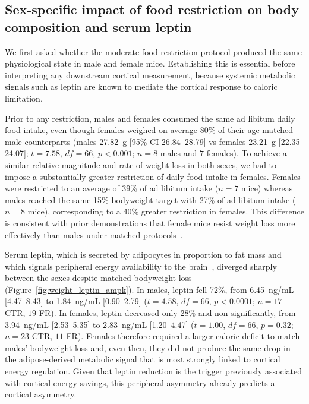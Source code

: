 \documentclass[11pt]{article}
\begin{document}
\subsection{Sex-specific impact of food restriction on body composition and serum leptin}

We first asked whether the moderate food-restriction protocol produced the same physiological state in male and female mice. Establishing this is essential before interpreting any downstream cortical measurement, because systemic metabolic signals such as leptin are known to mediate the cortical response to caloric limitation.

Prior to any restriction, males and females consumed the same ad libitum daily food intake, even though females weighed on average 80\% of their age-matched male counterparts (males 27.82~g [95\% CI 26.84--28.79] vs females 23.21~g [22.35--24.07]; $t=7.58$, $df=66$, $p<0.001$; $n=8$ males and $7$ females). To achieve a similar relative magnitude and rate of weight loss in both sexes, we had to impose a substantially greater restriction of daily food intake in females. Females were restricted to an average of 39\% of ad libitum intake ($n=7$ mice) whereas males reached the same 15\% bodyweight target with 27\% of ad libitum intake ($n=8$ mice), corresponding to a 40\% greater restriction in females. This difference is consistent with prior demonstrations that female mice resist weight loss more effectively than males under matched protocols~\citep{lovdel2024hsd11b1, lopezdominguez2016omega3, greenfield2025lifespan, jeromson2024gdf15}.

Serum leptin, which is secreted by adipocytes in proportion to fat mass and which signals peripheral energy availability to the brain~\citep{zhang1994positional}, diverged sharply between the sexes despite matched bodyweight loss (Figure~\ref{fig:weight_leptin_ampk}). In males, leptin fell 72\%, from 6.45~ng/mL [4.47--8.43] to 1.84~ng/mL [0.90--2.79] ($t=4.58$, $df=66$, $p<0.0001$; $n=17$ CTR, $19$ FR). In females, leptin decreased only 28\% and non-significantly, from 3.94~ng/mL [2.53--5.35] to 2.83~ng/mL [1.20--4.47] ($t=1.00$, $df=66$, $p=0.32$; $n=23$ CTR, $11$ FR). Females therefore required a larger caloric deficit to match males' bodyweight loss and, even then, they did not produce the same drop in the adipose-derived metabolic signal that is most strongly linked to cortical energy regulation. Given that leptin reduction is the trigger previously associated with cortical energy savings, this peripheral asymmetry already predicts a cortical asymmetry.
\end{document}
